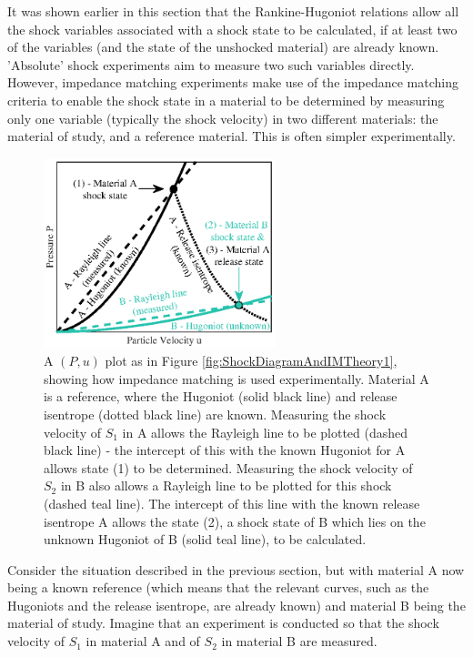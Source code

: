 
It was shown earlier in this section that the Rankine-Hugoniot relations allow all the shock variables associated with a shock state to be calculated, if at least two of the variables (and the state of the unshocked material) are already known. 'Absolute' shock experiments aim to measure two such variables directly. However, impedance matching experiments make use of the impedance matching criteria to enable the shock state in a material to be determined by measuring only one variable (typically the shock velocity) in two different materials: the material of study, and a reference material. This is often simpler experimentally.

\begin{figure}
\centering
\includegraphics[width=0.6\textwidth]{figures/Theory/MatlabIM2.eps}%
\caption{\label{fig:IMTheory2} A $(P,u)$ plot as in Figure \ref{fig:ShockDiagramAndIMTheory1}, showing how impedance matching is used experimentally. Material A is a reference, where the Hugoniot (solid black line) and release isentrope (dotted black line) are known. Measuring the shock velocity of $S_1$ in A allows the Rayleigh line to be plotted (dashed black line) - the intercept of this with the known Hugoniot for A allows state (1) to be determined. Measuring the shock velocity of $S_2$ in B also allows a Rayleigh line to be plotted for this shock (dashed teal line). The intercept of this line with the known release isentrope A allows the state (2), a shock state of B which lies on the unknown Hugoniot of B (solid teal line), to be calculated.}
\end{figure}

Consider the situation described in the previous section, but with material A now being a known reference (which means that the relevant curves, such as the Hugoniots and the release isentrope, are already known) and material B being the material of study. Imagine that an experiment is conducted so that the shock velocity of $S_1$ in material A and of $S_2$ in material B are measured.

